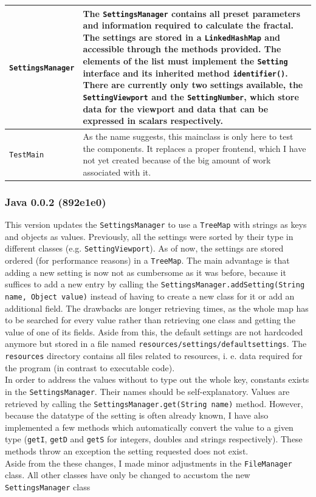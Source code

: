 \documentclass[10pt,a4paper,titlepage]{article}
\begin{document}
\begin{table}[h!]
\begin{tabular}{p{}|p{}}
			\hline 
			\verb|SettingsManager|& The \verb|SettingsManager| contains all preset parameters and information required to calculate the fractal. The settings are stored in a \verb|LinkedHashMap| and accessible through the methods provided. The elements of the list must implement the \verb|Setting| interface and its inherited method \verb|identifier()|. There are currently only two settings available, the \verb|SettingViewport| and the \verb|SettingNumber|, which store data for the viewport and data that can be expressed in scalars respectively. \\ 
			\hline 
			\verb|TestMain|& As the name suggests, this mainclass is only here to test the components. It replaces a proper frontend, which I have not yet created because of the big amount of work associated with it. \\ 
		\end{tabular} 
	\end{table}
	
	\subsubsection{Java 0.0.2 (892e1e0)}
	This version updates the \verb|SettingsManager| to use a \verb|TreeMap| with strings as keys and objects as values. Previously, all the settings were sorted by their type in different classes (e.g. \verb|SettingViewport|). As of now, the settings are stored ordered (for performance reasons) in a \verb|TreeMap|. The main advantage is that adding a new setting is now not as cumbersome as it was before, because it suffices to add a new entry by calling the \verb|SettingsManager.addSetting(String name, Object value)| instead of having to create a new class for it or add an additional field. The drawbacks are longer retrieving times, as the whole map has to be searched for every value rather than retrieving one class and getting the value of one of its fields. Aside from this, the default settings are not hardcoded anymore but stored in a file named \verb|resources/settings/defaultsettings|. The \verb|resources| directory contains all files related to resources, i. e. data required for the program (in contrast to executable code).\\
	In order to address the values without to type out the whole key, constants exists in the \verb|SettingsManager|. Their names should be self-explanatory. Values are retrieved by calling the \verb|SettingsManager.get(String name)| method. However, because the datatype of the setting is often already known, I have also implemented a few methods which automatically convert the value to a given type (\verb|getI|, \verb|getD| and \verb|getS| for integers, doubles and strings respectively). These methods throw an exception the setting requested does not exist.\\
	Aside from the these changes, I made minor adjustments in the \verb|FileManager| class. All other classes have only be changed to accustom the new \verb|SettingsManager| class
\end{document}
